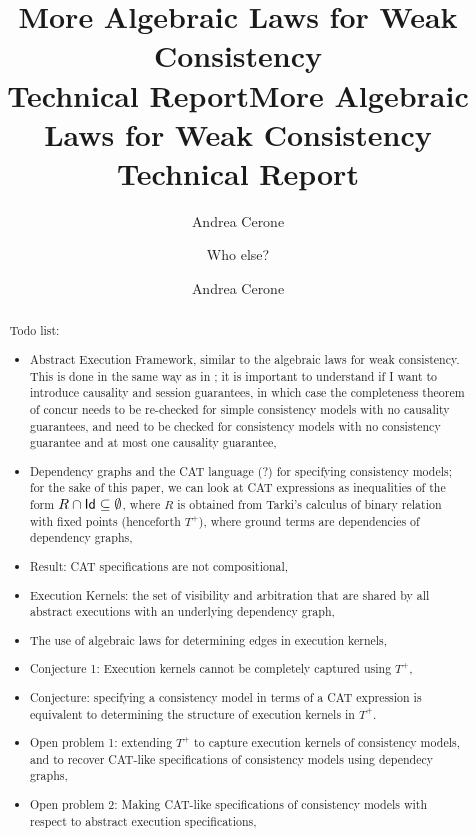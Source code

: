 \documentclass[a4paper,UKenglish]{article}%
\title{More Algebraic Laws for Weak Consistency\\{\Large Technical Report}}
\title{More Algebraic Laws for Weak Consistency\\{\Large Technical Report}}
\author[1]{Andrea Cerone}
\author{Who else?}
\affil[1]{Imperial College London, UK}
\author[1]{Andrea Cerone}
\affil[1]{Imperial College London, UK, \texttt{a.cerone@imperial.ac.uk}}
\theoremstyle{plain}
\begin{document}
%


\maketitle

\begin{abstract}
Todo list: 
\begin{itemize}
\item Abstract Execution Framework, similar to the algebraic laws for weak consistency. This 
is done in the same way as in \cite{laws}; it is important to understand if I want to introduce 
causality and session guarantees, in which case the completeness theorem of concur needs 
to be re-checked for simple consistency models with no causality guarantees, and 
need to be checked for consistency models with no consistency guarantee and at most 
one causality guarantee,
\item Dependency graphs and the CAT language (?) for specifying consistency models; for the 
sake of this paper, we can look at CAT expressions as inequalities of the form $R \cap \mathsf{Id} \subseteq \emptyset$, 
where $R$ is obtained from Tarki's calculus of binary relation with fixed points (henceforth $T^{+}$), where ground 
terms are dependencies of dependency graphs, 
\item Result: CAT specifications are not compositional,
\item Execution Kernels: the set of visibility and arbitration that are shared by all abstract 
executions with an underlying dependency graph, 
\item The use of algebraic laws for determining edges in execution kernels, 
\item Conjecture 1: Execution kernels cannot be completely captured using $T^{+}$,
\item Conjecture: specifying a consistency model in terms of a CAT expression is equivalent  
to determining the structure of execution kernels in $T^{+}$. 
\item Open problem 1: extending $T^{+}$ to capture execution kernels of consistency models, 
and to recover CAT-like specifications of consistency models using dependecy graphs,
\item Open problem 2: Making CAT-like specifications of consistency models with respect to 
abstract execution specifications,
\end{itemize}
\end{abstract}
\end{document}
